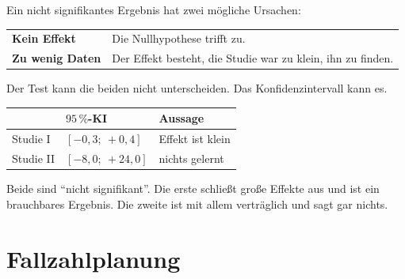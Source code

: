 \begin{warnung}
Ein nicht signifikantes Ergebnis hat zwei mögliche Ursachen:

\begin{center}
\renewcommand{\arraystretch}{1.5}
\begin{tabular}{@{}P{2.4cm}P{6.2cm}@{}}
\toprule
\textbf{Kein Effekt} & Die Nullhypothese trifft zu.\\
\textbf{Zu wenig Daten} & Der Effekt besteht, die Studie war zu klein, ihn zu finden.\\
\bottomrule
\end{tabular}
\end{center}

Der Test kann die beiden nicht unterscheiden. Das Konfidenzintervall kann es.

\begin{center}
\renewcommand{\arraystretch}{1.48}
\begin{tabular}{@{}P{2.0cm}P{3.0cm}P{3.2cm}@{}}
\toprule
& \textbf{$95\,\%$-KI} & \textbf{Aussage}\\
\midrule
Studie I & $[-0{,}3;\ +0{,}4]$ & \textcolor{gruen}{Effekt ist klein}\\
Studie II & $[-8{,}0;\ +24{,}0]$ & \textcolor{akzent}{nichts gelernt}\\
\bottomrule
\end{tabular}
\end{center}

Beide sind \enquote{nicht signifikant}. Die erste schließt große Effekte aus und ist ein brauchbares Ergebnis. Die zweite ist mit allem verträglich und sagt gar nichts.

\begin{center}
\begin{minipage}{0.88\textwidth}
\end{minipage}
\end{center}
\end{warnung}

\section{Fallzahlplanung}

